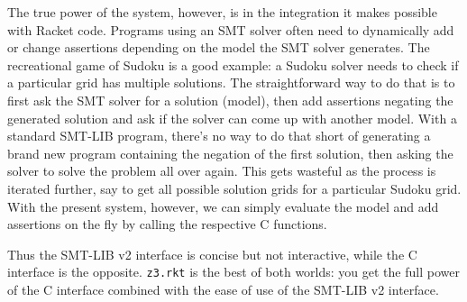 The true power of the system, however, is in the integration it makes possible
with Racket code. Programs using an SMT solver often need to dynamically add or
change assertions depending on the model the SMT solver generates. The
recreational game of Sudoku is a good example: a Sudoku solver needs to check if
a particular grid has multiple solutions. The straightforward way to do that is
to first ask the SMT solver for a solution (model), then add assertions negating
the generated solution and ask if the solver can come up with another
model. With a standard SMT-LIB program, there's no way to do that short of
generating a brand new program containing the negation of the first solution,
then asking the solver to solve the problem all over again. This gets wasteful
as the process is iterated further, say to get all possible solution grids for a
particular Sudoku grid. With the present system, however, we can simply evaluate
the model and add assertions on the fly by calling the respective C functions.

Thus the SMT-LIB v2 interface is concise but not interactive, while the C
interface is the opposite. \texttt{z3.rkt} is the best of both worlds: you get
the full power of the C interface combined with the ease of use of the SMT-LIB
v2 interface.
